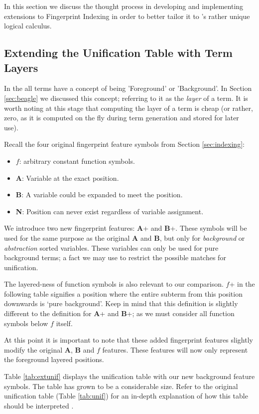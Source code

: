 In this section we discuss the thought process in developing and implementing
extensions to Fingerprint Indexing in order to better tailor it to \beagle's
rather unique logical calculus.

\subsection{Extending the Unification Table with Term Layers}

In the {\HSWAC} all terms have 
a concept of being 'Foreground' or 'Background'. In Section \ref{sec:beagle} we
discussed this concept; referring to it as the \emph{layer} of a term. It is
worth noting at this stage that computing the layer of a term is cheap (or rather,
zero, as it is computed on the fly during term generation and stored for later use).

Recall the four original fingerprint feature symbols from Section \ref{sec:indexing}:
\begin{itemize}
\item $f$: arbitrary constant function symbols.
\item \textbf{A}: Variable at the exact position.
\item \textbf{B}: A variable could be expanded to meet the position.
\item \textbf{N}: Position can never exist regardless of variable assignment.
\end{itemize}
We introduce two new fingerprint features: \textbf{A}+ and \textbf{B}+.
These symbols will be used for the same purpose as the original \textbf{A} and \textbf{B}, but
only for \emph{background} or \emph{abstraction} sorted variables. These variables
can only be used for pure background terms; a fact we may use to restrict the possible
matches for unification.

The layered-ness of function symbols is also relevant to our comparison.
$f$+ in the following table signifies a position where the entire subterm from this position downwards
is `pure background'. Keep in mind that this definition is slightly different
to the definition for \textbf{A}+ and \textbf{B}+; as we must consider all function
symbols below $f$ itself.

At this point it is important to note that these added fingerprint features slightly modify
the original \textbf{A}, \textbf{B} and $f$ features. These features will now
only represent the foreground layered positions.

Table \ref{tab:extunif} displays the unification table with our new background
feature symbols. The table has grown to be a considerable size.
Refer to the original unification table (Table \ref{tab:unif}) for an in-depth
explanation of how this table should be interpreted \cite{shulz12}.

